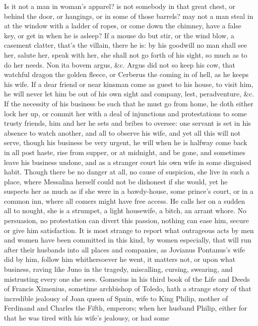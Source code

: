{Is it not a man in woman's apparel? is not somebody in that great
chest, or behind the door, or hangings, or in some of those barrels?
may not a man steal in at the window with a ladder of ropes, or come
down the chimney, have a false key, or get in when he is asleep? If a
mouse do but stir, or the wind blow, a casement clatter, that's the
villain, there he is: by his goodwill no man shall see her, salute her,
speak with her, she shall not go forth of his sight, so much as to do
her needs. Non ita bovem argus, \&c. Argus did not so keep his
cow, that watchful dragon the golden fleece, or Cerberus the coming in
of hell, as he keeps his wife. If a dear friend or near kinsman come as
guest to his house, to visit him, he will never let him be out of his
own sight and company, lest, peradventure, \&c. If the necessity of his
business be such that he must go from home, he doth either lock her up,
or commit her with a deal of injunctions and protestations to some
trusty friends, him and her he sets and bribes to oversee: one servant
is set in his absence to watch another, and all to observe his wife,
and yet all this will not serve, though his business be very urgent, he
will when he is halfway come back in all post haste, rise from supper,
or at midnight, and be gone, and sometimes leave his business undone,
and as a stranger court his own wife in some disguised habit. Though
there be no danger at all, no cause of suspicion, she live in such a
place, where Messalina herself could not be dishonest if she would, yet
he suspects her as much as if she were in a bawdy-house, some prince's
court, or in a common inn, where all comers might have free access. He
calls her on a sudden all to nought, she is a strumpet, a light
housewife, a bitch, an arrant whore. No persuasion, no protestation can
divert this passion, nothing can ease him, secure or give him
satisfaction. It is most strange to report what outrageous acts by men
and women have been committed in this kind, by women especially, that
will run after their husbands into all places and companies, as
Jovianus Pontanus's wife did by him, follow him whithersoever he went,
it matters not, or upon what business, raving like Juno in the tragedy,
miscalling, cursing, swearing, and mistrusting every one she sees.
Gomesius in his third book of the Life and Deeds of Francis Ximenius,
sometime archbishop of Toledo, hath a strange story of that incredible
jealousy of Joan queen of Spain, wife to King Philip, mother of
Ferdinand and Charles the Fifth, emperors; when her husband Philip,
either for that he was tired with his wife's jealousy, or had some
}
